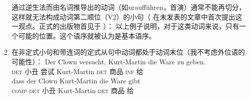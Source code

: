 \begin{enumerate}
通过逆生法而由名词推导出的动词（如uraufführen，首演）通常不能再切分，这样就无法构成动词第二顺位（V2）的小句（ \citet{Hoehle91b}在未发表的文章中首次提出这一观点。正式的出版物首见于 ）：
\eal
{}
\zl
以上例子说明，对于这类动词来说，只有一个可能的位置。这个语序就被认为是基本语序。
\item 在非定式小句和带连词的定式从句中动词都处于动词末位（我不考虑外位语的可能性）：
\eal
\ex 
\gll Der Clown versucht, Kurt-Martin die Ware zu geben.\\
     \textsc{det} 小丑 尝试 Kurt-Martin \textsc{det} 商品 \textsc{inf} 给\\
\ex 
\gll dass der Clown Kurt-Martin die Ware gibt\\
	 \textsc{comp} \textsc{det} 小丑 Kurt-Martin \textsc{det} 商品 给\\
\zl


\end{enumerate}
